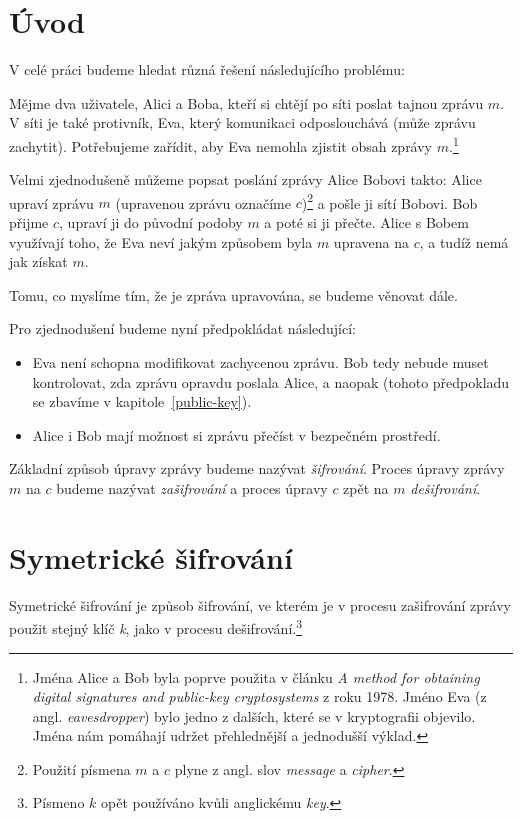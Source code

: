 \documentclass[12pt]{article}
\begin{document}
\part{Úvod}\label{introduction}


    V celé práci budeme hledat různá řešení následujícího problému:

    \medskip
    Mějme dva uživatele, Alici a Boba, kteří si chtějí po síti poslat tajnou zprávu $m$.
    V síti je také protivník, Eva, který komunikaci odposlouchává (může zprávu zachytit). Potřebujeme zařídit, aby Eva
    nemohla zjistit obsah zprávy $m$.\footnote{Jména Alice a Bob byla poprve použita v článku 
    \emph{A method for obtaining digital signatures and public-key cryptosystems} z roku 1978.
    Jméno Eva (z angl. \emph{eavesdropper}) bylo jedno z dalších, které se v kryptografii objevilo.
    Jména nám pomáhají udržet přehlednější a jednodušší výklad.}

    Velmi zjednodušeně můžeme popsat poslání zprávy Alice Bobovi takto:
    Alice upraví zprávu $m$ (upravenou zprávu označíme $c$)\footnote{Použití písmena $m$ a $c$ plyne z angl. slov \emph{message} a \emph{cipher}.}
    a pošle ji sítí Bobovi.
    Bob přijme $c$, upraví ji do původní podoby $m$ a poté si ji přečte.
    Alice s Bobem využívají toho, že Eva neví jakým způsobem byla $m$ upravena na $c$, a tudíž nemá jak získat $m$.

    \medskip
    Tomu, co myslíme tím, že je zpráva upravována, se budeme věnovat dále.

    \bigskip
    Pro zjednodušení budeme nyní předpokládat následující:

    \begin{itemize}
        \item
            Eva není schopna modifikovat zachycenou zprávu.
            Bob tedy nebude muset kontrolovat, zda zprávu opravdu poslala Alice, a naopak
            (tohoto předpokladu se zbavíme v kapitole~\ref{public-key}).
        \item
            Alice i Bob mají možnost si zprávu přečíst v bezpečném prostředí.
    \end{itemize}

    Základní způsob úpravy zprávy budeme nazývat \emph{šifrování}. Proces úpravy zprávy $m$ na $c$
    budeme nazývat \emph{zašifrování} a proces úpravy $c$ zpět na $m$ \emph{dešifrování}.

\newpage
\part{Symetrické šifrování}\label{private-key}
    Symetrické šifrování je způsob šifrování, ve kterém je v procesu zašifrování zprávy použit
    stejný klíč \emph{k}, jako v procesu dešifrování.\footnote{Písmeno $k$ opět používáno kvůli anglickému \emph{key}.}
\end{document}
